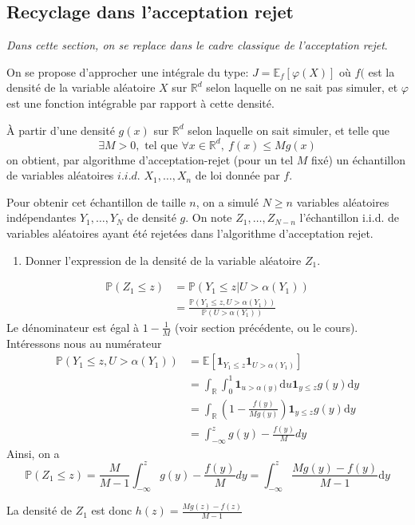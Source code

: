 \documentclass[]{article}
\providecommand{\tightlist}{%
  \setlength{\itemsep}{0pt}\setlength{\parskip}{0pt}}
\newenvironment{Correction}%
  { \vspace{\baselineskip}\begin{mdframed}[backgroundcolor=my_green]}%
  {\end{mdframed}}
\begin{document}
\hypertarget{recyclage-dans-lacceptation-rejet}{%
\subsection{Recyclage dans l'acceptation
rejet}\label{recyclage-dans-lacceptation-rejet}}

\emph{Dans cette section, on se replace dans le cadre classique de
l'acceptation rejet}.

On se propose d'approcher une intégrale du type:
\(J = \mathbb{E}_f[\varphi(X)]\) où \(f(\) est la densité de la variable
aléatoire \(X\) sur \(\mathbb{R}^d\) selon laquelle on ne sait pas
simuler, et \(\varphi\) est une fonction intégrable par rapport à cette
densité.

À partir d'une densité \(g(x)\) sur \(\mathbb{R}^d\) selon laquelle on
sait simuler, et telle que
\[\exists M>0,\text{ tel que } \forall x\in \mathbb{R}^d,~f(x) \leq Mg(x)\]
on obtient, par algorithme d'acceptation-rejet (pour un tel \(M\) fixé)
un échantillon de variables aléatoires \(i.i.d.\) \(X_1,\dots, X_n\) de
loi donnée par \(f\).

Pour obtenir cet échantillon de taille \(n\), on a simulé \(N\geq n\)
variables aléatoires indépendantes \(Y_1,\dots, Y_N\) de densité \(g\).
On note \(Z_1,\dots,Z_{N - n}\) l'échantillon i.i.d. de variables
aléatoires ayant été rejetées dans l'algorithme d'acceptation rejet.

\begin{enumerate}
\def\labelenumi{\arabic{enumi}.}
\setcounter{enumi}{4}
\tightlist
\item
  Donner l'expression de la densité de la variable aléatoire \(Z_1\).
\end{enumerate}

\begin{Correction}
\begin{align*}
\mathbb{P}(Z_1 \leq z) &= \mathbb{P}\left(Y_1\leq z \vert U > \alpha(Y_1)\right)\\
&= \frac{\mathbb{P}\left(Y_1\leq z , U > \alpha(Y_1)\right)}{\mathbb{P}\left(U > \alpha(Y_1)\right)}
\end{align*}
Le dénominateur est égal à $1 - \frac{1}{M}$ (voir section précédente, ou le cours).
Intéressons nous au numérateur
\begin{align*}
\mathbb{P}\left(Y_1\leq z , U > \alpha(Y_1)\right) &= \mathbb{E}\left[\mathbf{1}_{Y_1\leq z} \mathbf{1}_{U > \alpha(Y_1)}\right]\\
&=\int_{\mathbb{R}}\int_{0}^{1} \mathbf{1}_{u > \alpha(y)} \text{d} u \mathbf{1}_{y \leq z} g(y) \text{d} y\\
&=\int_{\mathbb{R}} \left(1 - \frac{f(y)}{Mg(y)}\right)  \mathbf{1}_{y \leq z} g(y) \text{d} y\\
&= \int_{-\infty}^z g(y) - \frac{f(y)}{M} dy
\end{align*}
Ainsi, on a
$$\mathbb{P}(Z_1\leq z) = \frac{M}{M - 1} \int_{-\infty}^z g(y) - \frac{f(y)}{M} dy = \int_{-\infty}^z \frac{Mg(y) - f(y)}{M - 1} \text{d}y$$

La densité de $Z_1$ est donc $h(z) = \frac{Mg(z) - f(z)}{M - 1}$ 
\end{Correction}
\end{document}
